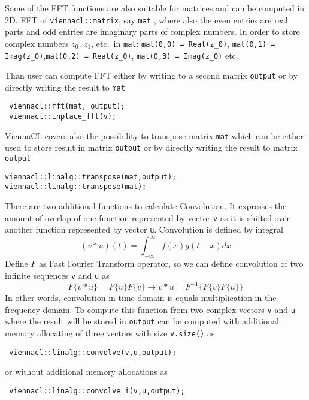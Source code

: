 Some of the FFT functions are also suitable for matrices and can be computed in 2D. FFT of \lstinline|viennacl::matrix|, say  \lstinline|mat| , 
where also the even entries are real parts and odd entries are imaginary parts of complex numbers. In order to store complex numbers $z_0$, $z_1$, 
etc.~in \lstinline|mat|: \lstinline|mat(0,0) = Real(z_0)|, \lstinline|mat(0,1) = Imag(z_0)|,\lstinline|mat(0,2) = Real(z_0)|, \lstinline|mat(0,3) = Imag(z_0)| etc.

Than user can compute FFT  either by writing to a second matrix \lstinline|output| or by directly writing the result to \lstinline|mat| 
\begin{lstlisting}
 viennacl::fft(mat, output);
 viennacl::inplace_fft(v);
\end{lstlisting}


ViennaCL covers also the possibility to transpose matrix \lstinline|mat| which can be either used to store result in  matrix \lstinline|output| or by directly writing the result to matrix  \lstinline|output|
\begin{lstlisting}
viennacl::linalg::transpose(mat,output);
viennacl::linalg::transpose(mat);
\end{lstlisting}


There are two additional functions to calculate Convolution. It expresses the amount of overlap of one function represented by vector \lstinline|v| as it is shifted over 
another function represented by vector \lstinline|u|. Convolution is defined by integral 
$$(v*u)(t) = \int_{-\infty}^\infty f(x)g(t-x) dx$$ Define $F$ as Fast Fourier Transform operator, so we can define convolution of two infinite sequences  \lstinline|v| and  \lstinline|u| as 
$$F\{v*u\} = F\{u\}F\{v\} \rightarrow v*u = F^{-1}\{F\{v\}F\{u\}\}$$
In other words, convolution in time domain is equals  multiplication in the frequency domain. To compute this function from two complex vectors \lstinline|v| and \lstinline|u| 
where the result will be stored in \lstinline|output| can be computed with additional memory allocating of three vectors with size \lstinline|v.size()| as  
\begin{lstlisting}
 viennacl::linalg::convolve(v,u,output);
\end{lstlisting}
or without additional memory allocations as
\begin{lstlisting}
 viennacl::linalg::convolve_i(v,u,output);
\end{lstlisting}

